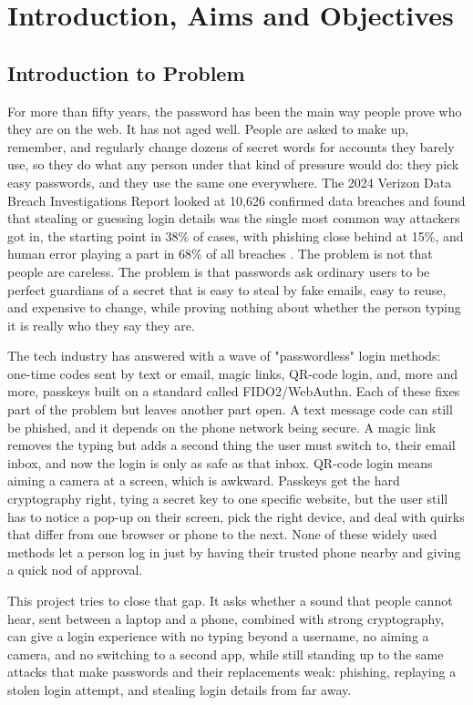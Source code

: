 \chapter{Introduction, Aims and Objectives}
\label{ch:introduction}

\section{Introduction to Problem}

For more than fifty years, the password has been the main way people prove
who they are on the web. It has not aged well. People are asked to make
up, remember, and regularly change dozens of secret words for accounts they
barely use, so they do what any person under that kind of pressure would
do: they pick easy passwords, and they use the same one everywhere. The
2024 Verizon Data Breach Investigations Report looked at 10,626 confirmed
data breaches and found that stealing or guessing login details was the
single most common way attackers got in, the starting point in 38\% of
cases, with phishing close behind at 15\%, and human error playing a part
in 68\% of all breaches \cite{verizon2024dbir}. The problem is not that
people are careless. The problem is that passwords ask ordinary users to
be perfect guardians of a secret that is easy to steal by fake emails, easy
to reuse, and expensive to change, while proving nothing about whether the
person typing it is really who they say they are.

The tech industry has answered with a wave of "passwordless" login methods:
one-time codes sent by text or email, magic links, QR-code login, and,
more and more, passkeys built on a standard called FIDO2/WebAuthn. Each of
these fixes part of the problem but leaves another part open. A text
message code can still be phished, and it depends on the phone network
being secure. A magic link removes the typing but adds a second thing the
user must switch to, their email inbox, and now the login is only as safe
as that inbox. QR-code login means aiming a camera at a screen, which is
awkward. Passkeys get the hard cryptography right, tying a secret key to
one specific website, but the user still has to notice a pop-up on their
screen, pick the right device, and deal with quirks that differ from one
browser or phone to the next. None of these widely used methods let a
person log in just by having their trusted phone nearby and giving a quick
nod of approval.

This project tries to close that gap. It asks whether a sound that people
cannot hear, sent between a laptop and a phone, combined with strong
cryptography, can give a login experience with no typing beyond a
username, no aiming a camera, and no switching to a second app, while
still standing up to the same attacks that make passwords and their
replacements weak: phishing, replaying a stolen login attempt, and
stealing login details from far away.

